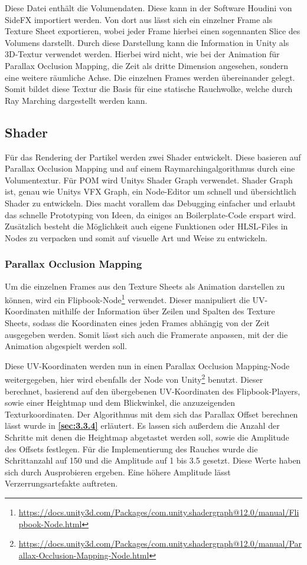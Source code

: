 Diese Datei enthält die Volumendaten. Diese kann in der Software Houdini von SideFX importiert werden. Von dort aus lässt sich ein einzelner Frame als
Texture Sheet exportieren, wobei jeder Frame hierbei einen sogennanten Slice des Volumens darstellt.
Durch diese Darstellung kann die Information in Unity als 3D-Textur verwendet werden.
Hierbei wird nicht, wie bei der Animation für Parallax Occlusion Mapping, die Zeit als dritte Dimension angesehen, sondern eine weitere räumliche Achse.
Die einzelnen Frames werden übereinander gelegt. Somit bildet diese Textur die Basis für eine statische Rauchwolke, welche durch Ray Marching dargestellt werden kann.



\subsection{Shader}
Für das Rendering der Partikel werden zwei Shader entwickelt. Diese basieren auf Parallax Occlusion Mapping und auf einem Raymarchingalgorithmus
durch eine Volumentextur. Für POM wird Unitys Shader Graph verwendet. Shader Graph ist, genau wie Unitys VFX Graph, ein Node-Editor um
schnell und übersichtlich Shader zu entwickeln. Dies macht vorallem das Debugging einfacher und erlaubt das schnelle Prototyping von Ideen,
da einiges an Boilerplate-Code erspart wird. Zusätzlich besteht die Möglichkeit auch eigene Funktionen oder HLSL-Files in Nodes
zu verpacken und somit auf visuelle Art und Weise zu entwickeln.


\subsubsection{Parallax Occlusion Mapping}

Um die einzelnen Frames aus den Texture Sheets als Animation darstellen zu können, wird ein
Flipbook-Node\footnote{\url{https://docs.unity3d.com/Packages/com.unity.shadergraph@12.0/manual/Flipbook-Node.html}}
verwendet. Dieser manipuliert die UV-Koordinaten mithilfe der Information über Zeilen und Spalten des Texture Sheets,
sodass die Koordinaten eines jeden Frames abhängig von der Zeit ausgegeben werden.
Somit lässt sich auch die Framerate anpassen, mit der die Animation abgespielt werden soll.

Diese UV-Koordinaten werden nun in einen Parallax Occlusion Mapping-Node weitergegeben, hier wird ebenfalls der Node von
Unity\footnote{\url{https://docs.unity3d.com/Packages/com.unity.shadergraph@12.0/manual/Parallax-Occlusion-Mapping-Node.html}}
benutzt. Dieser berechnet, basierend auf den übergebenen UV-Koordinaten des Flipbook-Players, sowie einer Heightmap und dem Blickwinkel, die anzuzeigenden Texturkoordinaten.
Der Algorithmus mit dem sich das Parallax Offset berechnen lässt wurde in \textbf{\autoref{sec:3.3.4}} erläutert.
Es lassen sich außerdem die Anzahl der Schritte mit denen die Heightmap abgetastet werden soll, sowie die Amplitude des Offsets festlegen.
Für die Implementierung des Rauches wurde die Schrittanzahl auf 150 und die Amplitude auf 1 bis 3.5 gesetzt. Diese Werte haben sich durch Ausprobieren ergeben.
Eine höhere Amplitude lässt Verzerrungsartefakte auftreten.


